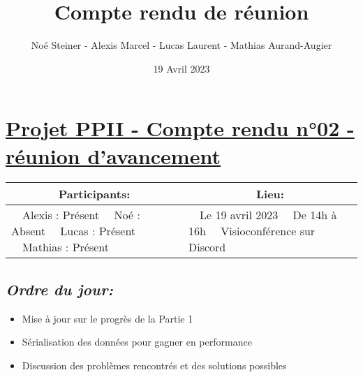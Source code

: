 \documentclass[french,a4paper]{article}
\author{Noé Steiner - Alexis Marcel - Lucas Laurent - Mathias Aurand-Augier}
\date{19 Avril 2023}
\newcommand{\tabitem}{\textbullet~~}\title{Compte rendu de réunion}
\begin{document}
\maketitle

\section*{\underline{Projet PPII - Compte rendu n°02 - réunion d'avancement}}

\begin{table}[!htb]
  \centering
  \begin{tabular}{| p{7cm} | p{7cm} |}
    \hline
    \multicolumn{1}{|c|}{ Participants:} & \multicolumn{1}{c|}{Lieu:} \\
    \hline
    \tabitem Alexis : Présent\newline
    \tabitem Noé : Absent\newline
    \tabitem Lucas : Présent\newline
    \tabitem Mathias : Présent                      &
    \tabitem Le 19 avril 2023\newline
    \tabitem De 14h à 16h\newline
    \tabitem Visioconférence sur Discord                                         \\
    \hline
  \end{tabular}
\end{table}

\subsection*{\textit{Ordre du jour:}}

\begin{itemize}
  \item Mise à jour sur le progrès de la Partie 1
  \item Sérialisation des données pour gagner en performance
  \item Discussion des problèmes rencontrés et des solutions possibles
\end{itemize}
\end{document}
